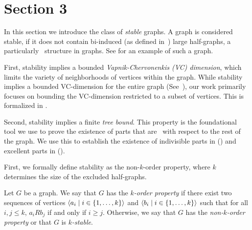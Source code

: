 \section{Section 3} \label{sec:section_3}

    In this section we introduce the class of \emph{stable} graphs.
    A graph is considered stable, if it does not contain bi-induced (as defined in~\cite{induced_subgraph_density_vi_bounded_vc_dimension})
    large half-graphs, a particularly \irregular{}~structure in graphs.
    See  for an example of such a graph. 

    First, stability implies a bounded \emph{Vapnik-Chervonenkis (VC) dimension}, which limits the variety of
    neighborhoods of vertices within the graph.
    While stability implies a bounded VC-dimension for the entire graph
    (See~\cite{regularity_partitions_and_the_topology_of_graphons}), our work primarily focuses on bounding
    the VC-dimension restricted to a subset of vertices.
    This is formalized in .

    Second, stability implies a finite \emph{tree bound}.
    This property is the foundational tool we use to prove the existence of parts that are \regular~with
    respect to the rest of the graph.
    We use this to establish the existence of indivisible parts in 
    () and
    excellent parts in  ().

    First, we formally define stability as the non-$k$-order property, where $k$ determines the size of the
    excluded half-graphs.

    \begin{definition} \label{def:k_order_property}
        Let $G$ be a graph.
        We say that $G$ has the \emph{$k$-order property} if there exist two sequences of vertices
        $\left< a_i \mid i \in \{ 1, \dots, k \} \right>$ and $\left< b_i \mid i \in \{ 1, \dots, k \} \right>$ such that
        for all $i,j \leq k$, $a_i R b_j$ if and only if $i \geq j$.
        Otherwise, we say that $G$ has the \emph{non-$k$-order property} or that $G$ is \emph{$k$-stable}.
    \end{definition}

